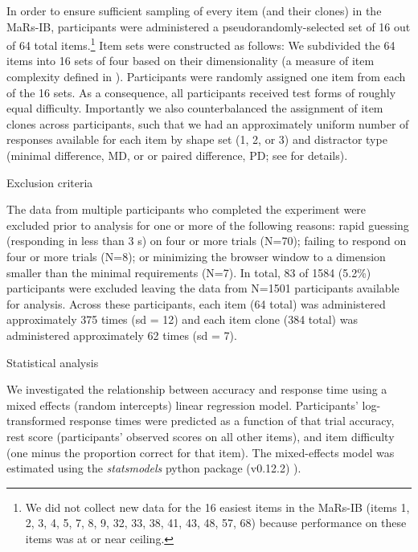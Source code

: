 \documentclass[a4paper,man,natbib]{apa6}
\makeatletter
\renewcommand{\subsubsection}{\@startsection{subsubsection}{3}
  {\z@}%
  {\b@level@two@skip}{\e@level@two@skip}%
  {\normalfont\normalsize\bfseries}}
\makeatother
\begin{document}
In order to ensure sufficient sampling of every item (and their clones) in the MaRs-IB, participants were administered a pseudorandomly-selected set of 16 out of 64 total items.\footnote{We did not collect new data for the 16 easiest items in the MaRs-IB (items 1, 2, 3, 4, 5, 7, 8, 9, 32, 33, 38, 41, 43, 48, 57, 68) because performance on these items was at or near ceiling.} Item sets were constructed as follows: We subdivided the 64 items into 16 sets of four based on their dimensionality (a measure of item complexity defined in \cite{chierchia2019matrix}). Participants were randomly assigned one item from each of the 16 sets. As a consequence, all participants received test forms of roughly equal difficulty. Importantly we also counterbalanced the assignment of item clones across participants, such that we had an approximately uniform number of responses available for each item by shape set (1, 2, or 3) and distractor type (minimal difference, MD, or or paired difference, PD; see \cite{chierchia2019matrix} for details). 

\subsubsection{Exclusion criteria}

The data from multiple participants who completed the experiment were excluded prior to analysis for one or more of the following reasons: rapid guessing (responding in less than 3 s) on four or more trials (N=70); failing to respond on four or more trials (N=8); or minimizing the browser window to a dimension smaller than the minimal requirements (N=7). In total, 83 of 1584 (5.2\%) participants were excluded leaving the data from N=1501 participants available for analysis. Across these participants, each item (64 total) was administered approximately 375 times (sd = 12) and each item clone (384 total) was administered approximately 62 times (sd = 7). 

\subsubsection{Statistical analysis}

We investigated the relationship between accuracy and response time using a mixed effects (random intercepts) linear regression model. Participants' log-transformed response times were predicted as a function of that trial accuracy, rest score (participants' observed scores on all other items), and item difficulty (one minus the proportion correct for that item). The mixed-effects model was estimated using the \textit{statsmodels} python package (v0.12.2) \citep{seabold2010statsmodels}).
\end{document}
